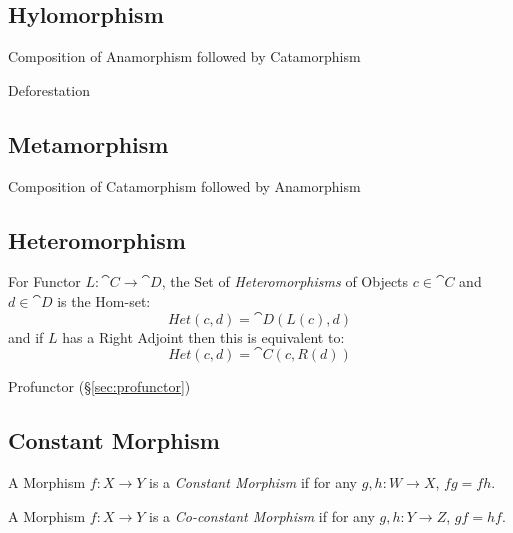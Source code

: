 \subsection{Hylomorphism}\label{sec:hylomorphism}

Composition of Anamorphism followed by Catamorphism

Deforestation



\subsection{Metamorphism}\label{sec:metamorphism}

Composition of Catamorphism followed by Anamorphism



\subsection{Heteromorphism}\label{sec:heteromorphism}

For Functor $L : \cat{C} \rightarrow \cat{D}$, the Set of
\emph{Heteromorphisms} of Objects $c \in \cat{C}$ and $d \in
\cat{D}$ is the Hom-set:
\[
  Het(c,d) = \cat{D}(L(c), d)
\]
and if $L$ has a Right Adjoint then this is equivalent to:
\[
  Het(c,d) = \cat{C}(c, R(d))
\]

Profunctor (\S\ref{sec:profunctor})



\subsection{Constant Morphism}\label{sec:constant_morphism}

A Morphism $f : X \rightarrow Y$ is a \emph{Constant Morphism} if for
any $g, h : W \rightarrow X$, $fg = fh$.

A Morphism $f : X \rightarrow Y$ is a \emph{Co-constant Morphism} if
for any $g, h : Y \rightarrow Z$, $gf = hf$.



